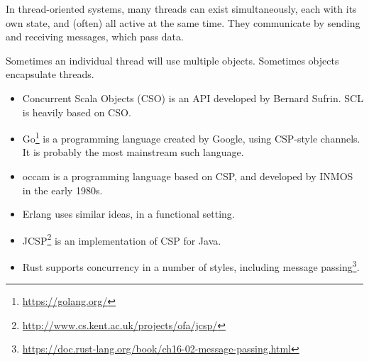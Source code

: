 In thread-oriented systems, many threads can exist simultaneously, each
with its own state, and (often) all active at the same time.  They communicate
by sending and receiving messages, which pass data.

Sometimes an individual thread will use multiple objects.  Sometimes objects
encapsulate threads.



\begin{itemize}
\item Concurrent Scala Objects (CSO) is an API developed by Bernard Sufrin.
  SCL is heavily based on CSO.

\item Go\footnote{\url{https://golang.org/}} is a programming language created
by Google, using CSP-style channels.  It is probably the most
mainstream such language.

\item
{\sf occam} is a programming language based on CSP, and developed by INMOS in
the early 1980s.

\item Erlang uses similar ideas, in a functional setting.

\item JCSP\footnote{\url{http://www.cs.kent.ac.uk/projects/ofa/jcsp/}} is an
implementation of CSP for Java.



\item Rust supports concurrency in a number of styles, including message
  passing\footnote{%
    \url{https://doc.rust-lang.org/book/ch16-02-message-passing.html}}. 

\end{itemize}


